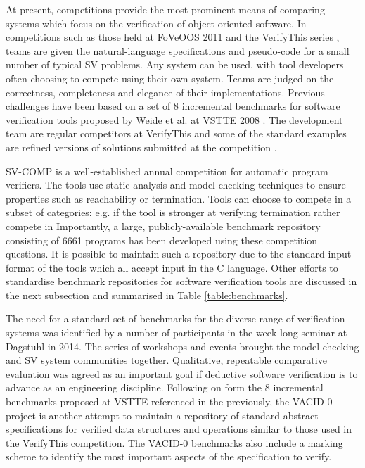 At present, competitions provide the most prominent means of comparing systems which focus on the verification of object-oriented software. In competitions such as those held at FoVeOOS 2011 \cite{bormer:hal-00789525} and the VerifyThis series \cite{Huisman2015}, teams are given the natural-language specifications and pseudo-code for a small number of typical SV problems. Any system can be used, with tool developers often choosing to compete using their own system. Teams are judged on the correctness, completeness and elegance of their implementations. Previous challenges have been based on a set of 8 incremental benchmarks for software verification tools proposed by Weide et al. at VSTTE 2008 \cite{Weide2008}. The \why development team are regular competitors at VerifyThis and some of the standard \why examples are refined versions of solutions submitted at the competition \cite{verifythis}.


SV-COMP \cite{Beyer2016, SVCOMP} is a well-established annual competition for automatic program verifiers. The tools use static analysis and model-checking techniques to ensure properties such as reachability or termination. Tools can choose to compete in a subset of categories: e.g. if the tool is stronger at verifying termination rather compete in   Importantly, a large, publicly-available benchmark repository consisting of 6661 programs  has been developed using these competition questions. It is possible to maintain such a repository due to the standard input format of the tools which all accept input in the C language. Other efforts to standardise benchmark repositories for software verification tools are discussed in the next subsection and summarised in Table \ref{table:benchmarks}.  

The need for a standard set of benchmarks for the diverse range of verification systems was identified by a number of participants in the week-long seminar at Dagstuhl \cite{Dagstuhl} in 2014. The series of workshops and events brought the model-checking and SV system communities together. Qualitative, repeatable comparative evaluation was agreed as an important goal if deductive software verification is to advance as an engineering discipline. Following on form the 8 incremental benchmarks proposed at VSTTE referenced in the previously, the VACID-0 \cite{Leino10vacid-0:verification} project is another attempt to maintain a repository of standard abstract specifications for verified data structures and operations similar to those used in the VerifyThis competition. The VACID-0 benchmarks also include a marking scheme to identify the most important aspects of the specification to verify.

